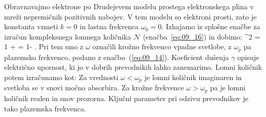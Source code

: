 Obravnavajmo elektrone po Drudejevem modelu prostega elektronskega plina
v mreži nepremičnih pozitivnih nabojev. V tem modelu so elektroni prosti,
zato je konstanta vzmeti $k=0$ in lastna frekvenca $\omega_0=0$. Izhajamo 
iz splošne enačbe za izračun kompleksnega lomnega količnika $\mathcal{N}$
(enačba~\ref{eq:09_16}) in dobimo:
\beq
{}^2 = 1 +  = 1- 
.
\label{eq:09_36}
\eeq
Pri tem smo z $\omega$ označili krožno frekvenco vpadne svetlobe, z
$\omega_p$ pa plazemsko frekvenco, podano z enačbo~(\ref{eq:09_14}). 
Koeficient dušenja $\gamma$ opisuje električno upornost, ki jo v dobrih
prevodnikih lahko zanemarimo. Lomni količnik potem izračunamo kot:
Za vrednosti $\omega < \omega_p$ je lomni količnik imaginaren in svetloba se v snovi
močno absorbira. Za krožne frekvence $\omega > \omega_p$ pa je lomni količnik realen 
in snov prozorna. Ključni parameter pri odzivu prevodnikov je tako plazemska frekvenca. 

